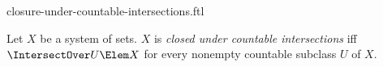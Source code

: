 \documentclass{stex}
\begin{document}
\begin{smodule}{closure-under-countable-intersections.ftl}



\begin{definition*}[forthel,for=closed under countable intersections]
  Let $X$ be a system of sets.
  $X$ is \emph{closed under countable intersections} iff $\IntersectOver U \Elem X$ for every nonempty countable subclass $U$ of $X$.
\end{definition*}

\end{smodule}
\end{document}
